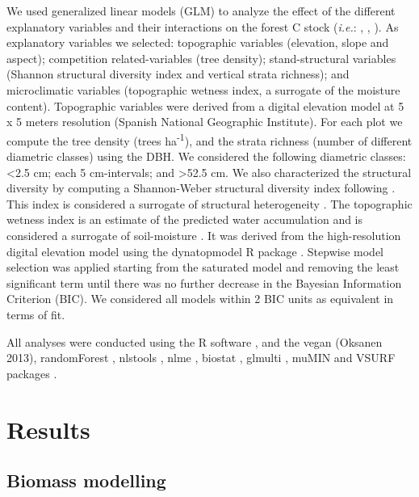 We used generalized linear models (GLM) to analyze the effect of the different explanatory variables and their interactions on the forest C stock (\emph{i.e.}: \wt, \ws, \wro). As explanatory variables we selected: topographic variables (elevation, slope and aspect); competition related-variables (tree density); stand-structural variables (Shannon structural diversity index and vertical strata richness); and microclimatic variables (topographic wetness index, a surrogate of the moisture content). Topographic variables were derived from a digital elevation model at 5 x 5 meters resolution (Spanish National Geographic Institute). For each plot we compute the tree density (trees ha\textsuperscript{-1}), and the strata richness (number of different diametric classes) using the DBH. We considered the following diametric classes: \textless2.5 cm; each 5 cm-intervals; and \textgreater52.5 cm. We also characterized the structural diversity by computing a Shannon-Weber structural diversity index following \autocite{delRioetal2003IndicesStand}. This index is considered a surrogate of structural heterogeneity \autocite{McElhinnyetal2005ForestWoodland,Gadowetal2012ForestStructure}. The topographic wetness index is an estimate of the predicted water accumulation and is considered a surrogate of soil-moisture \autocites[\emph{e.g.}][]{Zinkoetal2005PlantSpecies,Petrosellietal2013EcologicalBehavior}. It was derived from the high-resolution digital elevation model using the dynatopmodel R package \autocite{Metcalfeetal2018DynatopmodelImplementation}. Stepwise model selection was applied starting from the saturated model and removing the least significant term until there was no further decrease in the Bayesian Information Criterion (BIC). We considered all models within 2 BIC units as equivalent in terms of fit.

All analyses were conducted using the R software \autocite{base}, and the vegan (Oksanen 2013), randomForest \autocite{LiawWiener2002ClassificationRegression}, nlstools \autocite{nlstools}, nlme \autocite{Pinheiroetal2020NlmeLinear}, biostat \autocite{biostat}, glmulti \autocite{Calcagno2020GlmultiModel}, muMIN \autocite{Barton2020MuMInMultimodel} and VSURF packages \autocite{Genueretal2019VSURFVariable}. 

\section{Results}\label{sec:carbon:results}
\subsection{Biomass modelling}\label{sec:carbon:results-modelling}


